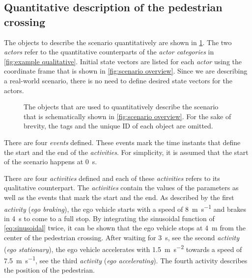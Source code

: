 \subsection{Quantitative description of the pedestrian crossing}
\label{sec:example quantitative}

The objects to describe the scenario quantitatively are shown in \cref{fig:example quantitative}. The two \textit{actors} refer to the quantitative counterparts of the \textit{actor categories} in \cref{fig:example qualitative}. Initial state vectors are listed for each \textit{actor} using the coordinate frame that is shown in \cref{fig:scenario overview}. 
Since we are describing a real-world scenario, there is no need to define desired state vectors for the actors.


\begin{figure}[t]
	\centering
	
	\caption{The objects that are used to quantitatively describe the scenario that is schematically shown in \cref{fig:scenario overview}. For the sake of brevity, the tags and the unique ID of each object are omitted.}
	\label{fig:example quantitative}
\end{figure}

\cstartb There are four \textit{events} defined. These events mark the time instants that define the start and the end of the \textit{activities}. For simplicity, it is assumed that the start of the scenario happens at \SI{0}{\second}. \cendb

There are four \textit{activities} defined and each of these \textit{activities} refers to its qualitative counterpart.
The \textit{activities} contain the values of the parameters as well as \cstartb the events that mark the start and the end\cendb. 
As described by the first \textit{activity} (\emph{ego braking}), the ego vehicle starts with a speed of \SI{8}{\meter\per\second} and brakes in \SI{4}{\second} to come to a full stop. By integrating the sinusoidal function of \cref{eq:sinusoidal} twice, it can be shown that the ego vehicle stops at \SI{4}{\meter} from the center of the pedestrian crossing. After waiting for \SI{3}{\second}, see the second \textit{activity} (\emph{ego stationary}), the ego vehicle accelerates with \SI{1.5}{\meter\per\second\squared} towards a speed of \SI{7.5}{\meter\per\second}, see the third \textit{activity} (\emph{ego accelerating}). The fourth activity describes the position of the pedestrian.

